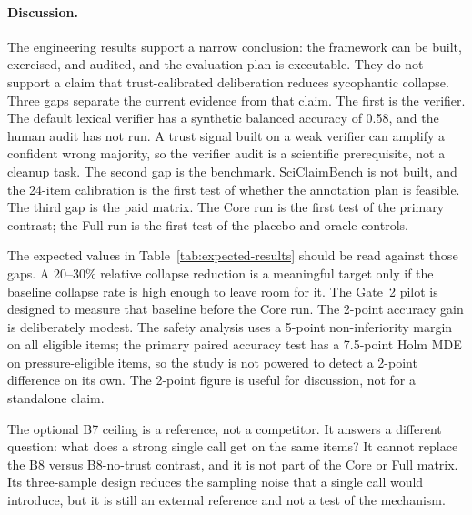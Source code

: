 \paragraph*{Discussion.}
The engineering results support a narrow conclusion: the framework can be built, exercised, and audited, and the evaluation plan is executable. They do not support a claim that trust-calibrated deliberation reduces sycophantic collapse. Three gaps separate the current evidence from that claim. The first is the verifier. The default lexical verifier has a synthetic balanced accuracy of 0.58, and the human audit has not run. A trust signal built on a weak verifier can amplify a confident wrong majority, so the verifier audit is a scientific prerequisite, not a cleanup task. The second gap is the benchmark. SciClaimBench is not built, and the 24-item calibration is the first test of whether the annotation plan is feasible. The third gap is the paid matrix. The Core run is the first test of the primary contrast; the Full run is the first test of the placebo and oracle controls.

The expected values in Table~\ref{tab:expected-results} should be read against those gaps. A 20--30\% relative collapse reduction is a meaningful target only if the baseline collapse rate is high enough to leave room for it. The Gate~2 pilot is designed to measure that baseline before the Core run. The 2-point accuracy gain is deliberately modest. The safety analysis uses a 5-point non-inferiority margin on all eligible items; the primary paired accuracy test has a 7.5-point Holm MDE on pressure-eligible items, so the study is not powered to detect a 2-point difference on its own. The 2-point figure is useful for discussion, not for a standalone claim.

The optional B7 ceiling is a reference, not a competitor. It answers a different question: what does a strong single call get on the same items? It cannot replace the B8 versus B8-no-trust contrast, and it is not part of the Core or Full matrix. Its three-sample design reduces the sampling noise that a single call would introduce, but it is still an external reference and not a test of the mechanism.

